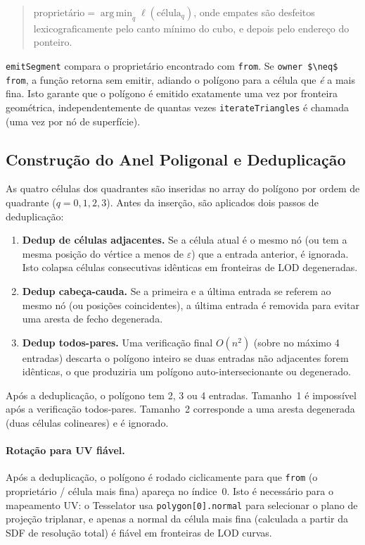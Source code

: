 \documentclass[10pt,a4paper]{article}
\DeclareMathOperator*{\argmin}{arg\,min}
\begin{document}
\begin{quote}
  $\text{proprietário} = \argmin_{q} \ell(\text{célula}_q)$,
  onde empates são desfeitos lexicograficamente pelo canto mínimo
  do cubo, e depois pelo endereço do ponteiro.
\end{quote}

\lstinline{emitSegment} compara o proprietário encontrado com
\lstinline{from}. Se \lstinline{owner $\neq$ from}, a função retorna
sem emitir, adiando o polígono para a célula que \emph{é} a mais
fina. Isto garante que o polígono é emitido exatamente uma vez por
fronteira geométrica, independentemente de quantas vezes
\lstinline{iterateTriangles} é chamada (uma vez por nó de superfície).

\subsection{Construção do Anel Poligonal e Deduplicação}
\label{sec:itriangles:dedup}

As quatro células dos quadrantes são inseridas no array do polígono
por ordem de quadrante ($q=0,1,2,3$). Antes da inserção, são
aplicados dois passos de deduplicação:

\begin{enumerate}
  \item \textbf{Dedup de células adjacentes.} Se a célula atual é o
    mesmo nó (ou tem a mesma posição do vértice a menos de
    $\varepsilon$) que a entrada anterior, é ignorada. Isto colapsa
    células consecutivas idênticas em fronteiras de LOD degeneradas.
  \item \textbf{Dedup cabeça-cauda.} Se a primeira e a última entrada
    se referem ao mesmo nó (ou posições coincidentes), a última
    entrada é removida para evitar uma aresta de fecho degenerada.
  \item \textbf{Dedup todos-pares.} Uma verificação final $O(n^2)$
    (sobre no máximo 4 entradas) descarta o polígono inteiro se duas
    entradas não adjacentes forem idênticas, o que produziria um
    polígono auto-intersecionante ou degenerado.
\end{enumerate}

Após a deduplicação, o polígono tem 2, 3 ou 4 entradas. Tamanho~1 é
impossível após a verificação todos-pares. Tamanho~2 corresponde a
uma aresta degenerada (duas células colineares) e é ignorado.

\paragraph{Rotação para UV fiável.}
Após a deduplicação, o polígono é rodado ciclicamente para que
\lstinline{from} (o proprietário / célula mais fina) apareça no
índice~0. Isto é necessário para o mapeamento UV: o Tesselator usa
\lstinline{polygon[0].normal} para selecionar o plano de projeção
triplanar, e apenas a normal da célula mais fina (calculada a partir
da SDF de resolução total) é fiável em fronteiras de LOD curvas.
\end{document}
